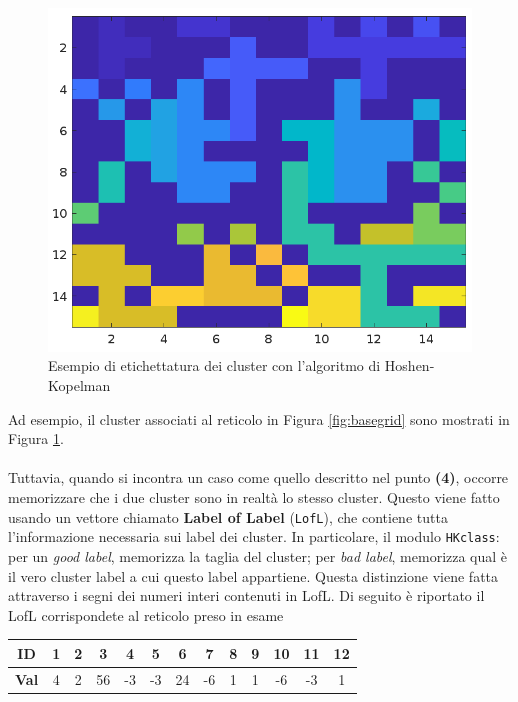 \begin{figure}[H]
\begin{minipage}{0.45\textwidth}
		\includegraphics[width=\linewidth]{images/labels}
		
	\end{minipage}
	\caption{Esempio di etichettatura dei cluster con l’algoritmo di Hoshen-Kopelman}
	\label{fig:clustered}
\end{figure}
\noindent
Ad esempio, il cluster associati al reticolo in Figura \ref{fig:basegrid} sono mostrati in Figura \ref{fig:clustered}.
\\\\
\noindent
Tuttavia, quando si incontra un caso come quello descritto nel punto \textbf{(4)}, occorre  memorizzare che i due cluster sono in realtà lo stesso cluster. Questo viene fatto usando un vettore chiamato \textbf{Label of Label} (\texttt{LofL}), che contiene tutta l’informazione necessaria sui label dei cluster. In particolare, il modulo \texttt{HKclass}: 
per un \textit{good label}, memorizza la taglia del cluster; 
per \textit{bad label}, memorizza qual è il vero cluster label a cui questo label appartiene.  Questa distinzione viene fatta attraverso i segni dei numeri interi contenuti in LofL. Di seguito è riportato il LofL corrispondete al reticolo preso in esame

\vspace{15px}
\noindent
\begin{tabular}{|c|*{12}{c|}}
	\hline
	\textbf{ID}   & 1 & 2 & 3 & 4 & 5 & 6 & 7 & 8 & 9 & 10 & 11 & 12 \\
	\hline
	\textbf{Val}  & 4 & 2 & 56 & -3 & -3 & 24 & -6 & 1 & 1 & -6 & -3 & 1 \\
	\hline
\end{tabular}

